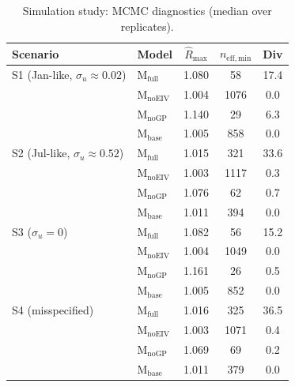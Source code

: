 \begin{table}[h!]
  \caption{Simulation study: MCMC diagnostics (median over replicates).}
  \label{tab:sim_diag}
  \centering
  \begin{tabular}{llccc}
    \toprule
    Scenario & Model & $\hat{R}_{\max}$ & $n_{\mathrm{eff,min}}$ & Div \\
    \midrule
    S1 (Jan-like, $\sigma_u\!\approx\!0.02$) & $\mathrm{M_{full}}$ & 1.080 & 58 & 17.4 \\
     & $\mathrm{M_{noEIV}}$ & 1.004 & 1076 & 0.0 \\
     & $\mathrm{M_{noGP}}$ & 1.140 & 29 & 6.3 \\
     & $\mathrm{M_{base}}$ & 1.005 & 858 & 0.0 \\
    \addlinespace
    S2 (Jul-like, $\sigma_u\!\approx\!0.52$) & $\mathrm{M_{full}}$ & 1.015 & 321 & 33.6 \\
     & $\mathrm{M_{noEIV}}$ & 1.003 & 1117 & 0.3 \\
     & $\mathrm{M_{noGP}}$ & 1.076 & 62 & 0.7 \\
     & $\mathrm{M_{base}}$ & 1.011 & 394 & 0.0 \\
    \addlinespace
    S3 ($\sigma_u\!=\!0$) & $\mathrm{M_{full}}$ & 1.082 & 56 & 15.2 \\
     & $\mathrm{M_{noEIV}}$ & 1.004 & 1049 & 0.0 \\
     & $\mathrm{M_{noGP}}$ & 1.161 & 26 & 0.5 \\
     & $\mathrm{M_{base}}$ & 1.005 & 852 & 0.0 \\
    \addlinespace
    S4 (misspecified) & $\mathrm{M_{full}}$ & 1.016 & 325 & 36.5 \\
     & $\mathrm{M_{noEIV}}$ & 1.003 & 1071 & 0.4 \\
     & $\mathrm{M_{noGP}}$ & 1.069 & 69 & 0.2 \\
     & $\mathrm{M_{base}}$ & 1.011 & 379 & 0.0 \\
    \bottomrule
  \end{tabular}
\end{table}

